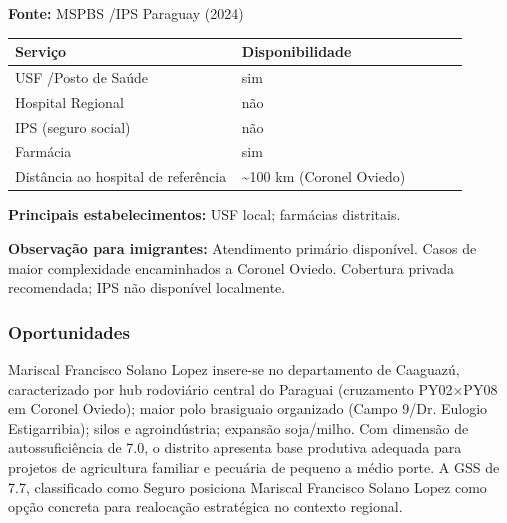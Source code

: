 \textbf{Fonte:} MSPBS /\allowbreak  IPS Paraguay (2024)

{\def\LTcaptype{none} %
\begin{longtable}{@{}>{\raggedright\arraybackslash}p{0.45\linewidth} >{\raggedright\arraybackslash}p{0.45\linewidth}@{}}
\toprule\noalign{}
Serviço & Disponibilidade \\
\midrule\noalign{}
\endhead
\bottomrule\noalign{}
\endlastfoot
USF /\allowbreak  Posto de Saúde & sim \\
Hospital Regional & não \\
IPS (seguro social) & não \\
Farmácia & sim \\
Distância ao hospital de referência & \textasciitilde100 km (Coronel
Oviedo) \\
\end{longtable}
}

\textbf{Principais estabelecimentos:} USF local; farmácias distritais.

\textbf{Observação para imigrantes:} Atendimento primário disponível.
Casos de maior complexidade encaminhados a Coronel Oviedo. Cobertura
privada recomendada; IPS não disponível localmente.
\newpage

\subsubsection*{Oportunidades}\label{oport-mariscal-francisco-solano-lopez-0516}
Mariscal Francisco Solano Lopez insere-se no departamento de Caaguazú, caracterizado por hub rodoviário central do Paraguai (cruzamento PY02×PY08 em Coronel Oviedo); maior polo brasiguaio organizado (Campo 9/Dr. Eulogio Estigarribia); silos e agroindústria; expansão soja/milho. Com dimensão de autossuficiência de 7.0, o distrito apresenta base produtiva adequada para projetos de agricultura familiar e pecuária de pequeno a médio porte. A GSS de 7.7, classificado como Seguro posiciona Mariscal Francisco Solano Lopez como opção concreta para realocação estratégica no contexto regional.


